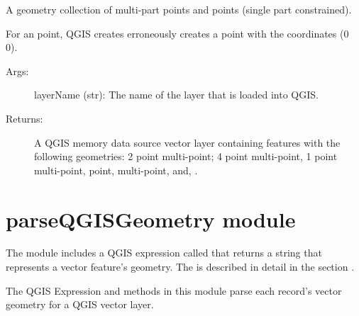 \documentclass[a4paper,11pt,english]{sphinxmanual}
\begin{document}

\begin{fulllineitems}
\label{\detokenize{API:modelVectorLayers.createMultiPoints}}
A geometry collection of multi-part points and points (single part constrained).

For an  point, QGIS creates erroneously creates a point with the coordinates (0 0).
\begin{description}
\item[{Args:}] \leavevmode
layerName (str): The name of the layer that is loaded into QGIS.

\item[{Returns:}] \leavevmode
A QGIS memory data source vector layer containing features with the following geometries: 2 point multi-point; 4 point multi-point,
1 point multi-point, point,  multi-point, and, .

\end{description}

\end{fulllineitems}



\section{parseQGISGeometry module}
\label{\detokenize{API:parseqgisgeometry-module}}\label{\detokenize{API:parseqgisgeometry-api}}
The  module includes a QGIS expression called  that returns a string that represents a vector feature’s geometry.  The  is described in detail in the section {\hyperref[\detokenize{pluginDesign:geometry-describing-expression}]{}}.

\label{\detokenize{API:module-parseQGISGeometry}}
The QGIS Expression and methods in this module parse each record’s vector geometry for a QGIS vector layer.
\end{document}
